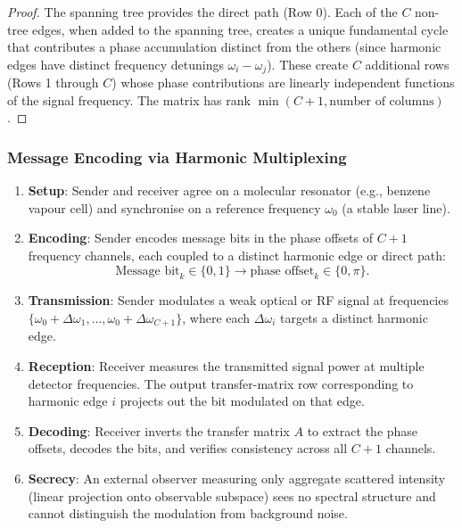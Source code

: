\documentclass[11pt,twocolumn,a4paper]{article}
\theoremstyle{definition}
\begin{document}
\begin{proof}
The spanning tree provides the direct path (Row 0). Each of the $C$ non-tree edges, when added to the spanning tree, creates a unique fundamental cycle that contributes a phase accumulation distinct from the others (since harmonic edges have distinct frequency detunings $\omega_i - \omega_j$). These create $C$ additional rows (Rows 1 through $C$) whose phase contributions are linearly independent functions of the signal frequency. The matrix has rank $\min(C+1, \text{number of columns})$.
\end{proof}

\subsubsection{Message Encoding via Harmonic Multiplexing}

\begin{protocol}
\label{prot:harmonic}
\begin{enumerate}[nosep]
\item \textbf{Setup}: Sender and receiver agree on a molecular resonator (e.g., benzene vapour cell) and synchronise on a reference frequency $\omega_0$ (a stable laser line).

\item \textbf{Encoding}: Sender encodes message bits in the phase offsets of $C+1$ frequency channels, each coupled to a distinct harmonic edge or direct path:
\[
\text{Message bit}_k \in \{0,1\} \rightarrow \text{phase offset}_k \in \{0, \pi\}.
\]

\item \textbf{Transmission}: Sender modulates a weak optical or RF signal at frequencies $\{\omega_0 + \Delta\omega_1, \ldots, \omega_0 + \Delta\omega_{C+1}\}$, where each $\Delta\omega_i$ targets a distinct harmonic edge.

\item \textbf{Reception}: Receiver measures the transmitted signal power at multiple detector frequencies. The output transfer-matrix row corresponding to harmonic edge $i$ projects out the bit modulated on that edge.

\item \textbf{Decoding}: Receiver inverts the transfer matrix $A$ to extract the phase offsets, decodes the bits, and verifies consistency across all $C+1$ channels.

\item \textbf{Secrecy}: An external observer measuring only aggregate scattered intensity (linear projection onto observable subspace) sees no spectral structure and cannot distinguish the modulation from background noise.
\end{enumerate}
\end{protocol}
\end{document}
